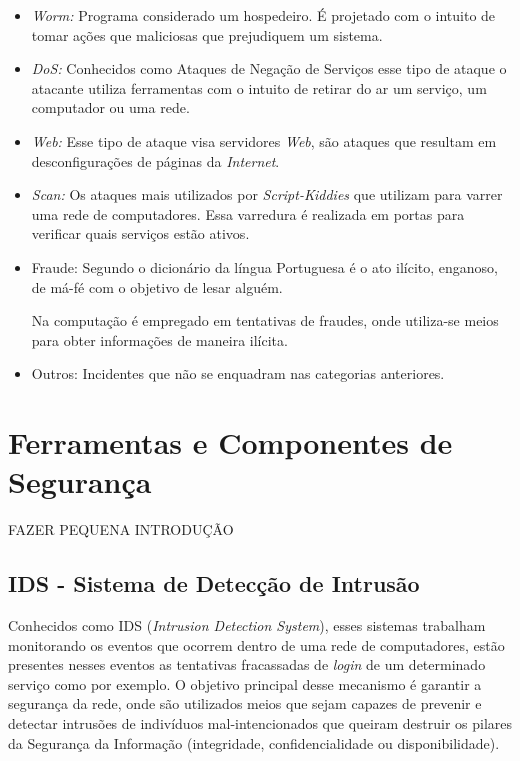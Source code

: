 \begin{itemize}
\item \textit{Worm:} Programa considerado um hospedeiro. É projetado com o intuito de tomar ações que maliciosas que prejudiquem um sistema.

\item \textit{DoS:} Conhecidos como Ataques de Negação de Serviços esse tipo de ataque o atacante utiliza ferramentas com o intuito de retirar do ar um serviço, um computador ou uma rede.

\item \textit{Web:} Esse tipo de ataque visa servidores \textit{Web}, são ataques que resultam em desconfigurações de páginas da \textit{Internet}.

\item \textit{Scan:} Os ataques mais utilizados por \textit{Script-Kiddies} que utilizam para varrer uma rede de computadores. Essa varredura é realizada em portas para verificar quais serviços estão ativos. 

\item Fraude: Segundo o dicionário da língua Portuguesa é o ato ilícito, enganoso, de má-fé com o objetivo de lesar alguém. 

Na computação é empregado em tentativas de fraudes, onde utiliza-se meios para obter informações de maneira ilícita.

\item Outros: Incidentes que não se enquadram nas categorias anteriores.
\end{itemize}

\section{Ferramentas e Componentes de Segurança}
FAZER PEQUENA INTRODUÇÃO 

\subsection{IDS - Sistema de Detecção de Intrusão}
Conhecidos como IDS (\textit{Intrusion Detection System}), esses sistemas trabalham monitorando os eventos que ocorrem dentro de uma rede de computadores, estão presentes nesses eventos as tentativas fracassadas de \textit{login} de um determinado serviço como por exemplo. O objetivo principal desse mecanismo é garantir a segurança da rede, onde são utilizados meios que sejam capazes de prevenir e detectar intrusões de indivíduos mal-intencionados que queiram destruir os pilares da Segurança da Informação (integridade, confidencialidade ou disponibilidade).

